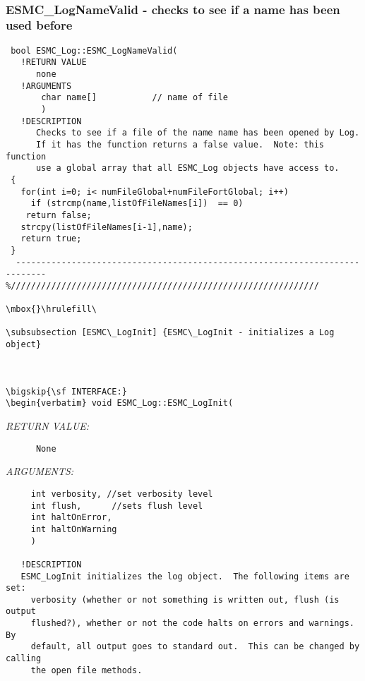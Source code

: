  
\mbox{}\hrulefill\ 
 
\subsubsection [ESMC\_LogNameValid] {ESMC\_LogNameValid - checks to see if a name has been used before}


  
\begin{verbatim} bool ESMC_Log::ESMC_LogNameValid(
   !RETURN VALUE
      none
   !ARGUMENTS
       char name[]           // name of file
       )
   !DESCRIPTION
      Checks to see if a file of the name name has been opened by Log.
      If it has the function returns a false value.  Note: this function
      use a global array that all ESMC_Log objects have access to.
 {
   for(int i=0; i< numFileGlobal+numFileFortGlobal; i++)
     if (strcmp(name,listOfFileNames[i])  == 0) 
 	return false;
   strcpy(listOfFileNames[i-1],name);
   return true;
 }
  ---------------------------------------------------------------------------- 
%/////////////////////////////////////////////////////////////
 
\mbox{}\hrulefill\ 
 
\subsubsection [ESMC\_LogInit] {ESMC\_LogInit - initializes a Log object}


  
\bigskip{\sf INTERFACE:}
\begin{verbatim} void ESMC_Log::ESMC_LogInit(\end{verbatim}{\em RETURN VALUE:}
\begin{verbatim}      None\end{verbatim}{\em ARGUMENTS:}
\begin{verbatim}       
     int verbosity, //set verbosity level
     int flush,      //sets flush level
     int haltOnError,
     int haltOnWarning
     )
 
   !DESCRIPTION
   ESMC_LogInit initializes the log object.  The following items are set:
     verbosity (whether or not something is written out, flush (is output 
     flushed?), whether or not the code halts on errors and warnings.  By
     default, all output goes to standard out.  This can be changed by calling
     the open file methods.\end{verbatim}
 
